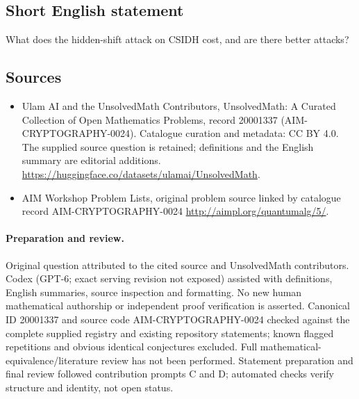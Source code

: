 \documentclass[11pt]{article}
\begin{document}
\subsection{Short English statement}
What does the hidden-shift attack on CSIDH cost, and are there better attacks?
\subsection{Sources}
\begin{itemize}
\item[\hypertarget{source:20001337:1}{S1}] Ulam AI and the UnsolvedMath Contributors, UnsolvedMath: A Curated Collection of Open Mathematics Problems, record 20001337 (AIM-CRYPTOGRAPHY-0024). Catalogue curation and metadata: CC BY 4.0. The supplied source question is retained; definitions and the English summary are editorial additions.
\url{https://huggingface.co/datasets/ulamai/UnsolvedMath}.
\item[\hypertarget{source:20001337:2}{S2}] AIM Workshop Problem Lists, original problem source linked by catalogue record AIM-CRYPTOGRAPHY-0024
\url{http://aimpl.org/quantumalg/5/}.
\end{itemize}
\paragraph{Preparation and review.}
Original question attributed to the cited source and UnsolvedMath contributors. Codex (GPT-6; exact serving revision not exposed) assisted with definitions, English summaries, source inspection and formatting. No new human mathematical authorship or independent proof verification is asserted. Canonical ID 20001337 and source code AIM-CRYPTOGRAPHY-0024 checked against the complete supplied registry and existing repository statements; known flagged repetitions and obvious identical conjectures excluded. Full mathematical-equivalence/literature review has not been performed. Statement preparation and final review followed contribution prompts C and D; automated checks verify structure and identity, not open status.
\label{end:20001337}
\end{document}
